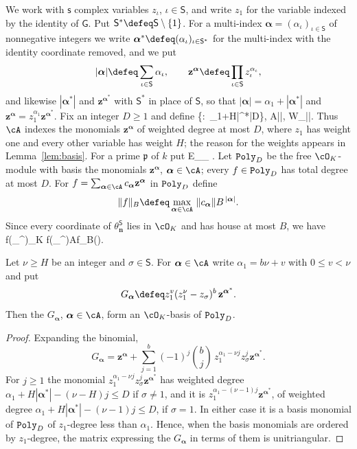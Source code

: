 \documentclass[11pt, reqno, twoside, letterpaper]{amsart}
\newcommand{\vn}{\mathbf{n}}
\newcommand{\va}{\boldsymbol{\alpha}}
\newcommand{\vz}{\mathbf{z}}
\newcommand{\house}[1]{\lVert #1\rVert}
\newcommand{\Nm}{\mathrm{N}}
\newcommand{\fp}{\mathfrak{p}}
\newcommand{\wgt}{H}
\newcommand{\dgb}{D}
\newcommand{\hB}{B}
\newcommand{\galKk}{\mathsf{G}}
\newcommand{\Kf}{K}
\newcommand{\idx}{\cA}
\newcommand{\PolyD}{{\tt Poly}_\dgb}
\newcommand{\rr}{A}
\newcommand{\Ew}{E}
\newcommand{\Sset}{\mathsf{S}}
\newcommand{\emb}{\iota}
\newcommand{\nS}{\mathsf{s}}
\newcommand{\cube}{\mathcal{N}}
\begin{document}
We work with $\nS$ complex variables $z_\emb$, $\emb\in\Sset$, and
write $z_1$ for the variable indexed by the identity of $\galKk$. Put
$\Sset^*\defeq\Sset\setminus\{1\}$. For a multi-index
$\va=(\alpha_\emb)_{\emb\in\Sset}$ of nonnegative integers we write
$\va^*\defeq(\alpha_\emb)_{\emb\in\Sset^*}$ for the multi-index with
the identity coordinate removed, and we put
\[
|\va|\defeq\sum_{\emb\in\Sset}\alpha_\emb,\qquad
\vz^{\va}\defeq\prod_{\emb\in\Sset}z_\emb^{\alpha_\emb},
\]
and likewise $|\va^*|$ and $\vz^{\va^*}$ with $\Sset^*$ in place of
$\Sset$, so that $|\va|=\alpha_1+|\va^*|$ and
$\vz^{\va}=z_1^{\alpha_1}\vz^{\va^*}$. Fix an integer $\dgb\ge 1$ and
define
\be\label{eq:idx}
\idx{}\{\va:\ \alpha_1+\wgt|\va^*|\le \dgb\},\qquad
\rr{}|\idx|,\qquad
W\sum_{\va\in\idx}|\va|.
\ee
Thus $\idx$ indexes the monomials $\vz^{\va}$ of weighted degree at
most $\dgb$, where $z_1$ has weight one and every other variable has
weight $\wgt$; the reason for the weights appears in
Lemma~\ref{lem:basis}. For a prime $\fp$ of $k$ put
\be\label{eq:E}
\Ew_\fp{}\sum_{\va\in\idx}\Big\lfloor\frac{\alpha_1}{\Nm\fp}\Big\rfloor
.
\ee
Let $\PolyD$ be the free $\cO_\Kf$-module with basis the monomials
$\vz^{\va}$, $\va\in\idx$; every $f\in\PolyD$ has total degree at most
$\dgb$. For $f=\sum_{\va\in\idx}c_{\va}\vz^{\va}$ in $\PolyD$ define
\[
\house{f}_\hB\defeq\max_{\va\in\idx}~\house{c_{\va}}\hB^{\,|\va|}.
\]
Since every coordinate of $\theta_\vn^{\Sset}$ lies in $\cO_\Kf$ and
has house at most $\hB$, we have
\be\label{eq:fP}
f(\theta_\vn^{\Sset})\in\cO_\Kf\mand
\house{f(\theta_\vn^{\Sset})}\le \rr\house{f}_\hB\qquad(\vn\in\cube).
\ee

\begin{lemma}\label{lem:basis}
Let $\nu\ge \wgt$ be an integer and $\sigma\in\Sset$. For $\va\in\idx$
write $\alpha_1=b\nu+v$ with $0\le v<\nu$ and put
\[
G_{\va}\defeq z_1^{v}(z_1^\nu-z_\sigma)^{b}\,\vz^{\va^*}.
\]
Then the $G_{\va}$, $\va\in\idx$, form an $\cO_\Kf$-basis of $\PolyD$.
\end{lemma}

\begin{proof}
Expanding the binomial,
\[
G_{\va}=\vz^{\va}+\sum_{j=1}^{b}(-1)^j\binom bj\,
z_1^{\alpha_1-\nu j}z_\sigma^{j}\vz^{\va^*}.
\]
For $j\ge 1$ the monomial
$z_1^{\alpha_1-\nu j}z_\sigma^{j}\vz^{\va^*}$ has weighted degree
$\alpha_1+\wgt|\va^*|-(\nu-\wgt)j\le\dgb$ if $\sigma\ne 1$, and it is
$z_1^{\alpha_1-(\nu-1)j}\vz^{\va^*}$, of weighted degree
$\alpha_1+\wgt|\va^*|-(\nu-1)j\le\dgb$, if $\sigma=1$. In either case
it is a basis monomial of $\PolyD$ of $z_1$-degree less than
$\alpha_1$. Hence, when the basis monomials are ordered by
$z_1$-degree, the matrix expressing the $G_{\va}$ in terms of them is
unitriangular.
\end{proof}
\end{document}
